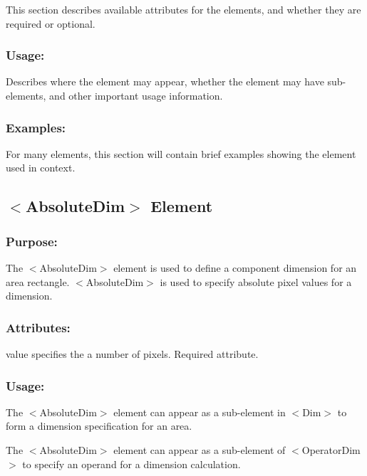 This section describes available attributes for the elements, and whether they are required or optional.\hypertarget{fal_element_ref_fal_elem_ref_sec_1_3}{}\subsubsection{Usage\+:}\label{fal_element_ref_fal_elem_ref_sec_1_3}
Describes where the element may appear, whether the element may have sub-\/elements, and other important usage information.\hypertarget{fal_element_ref_fal_elem_ref_sec_1_4}{}\subsubsection{Examples\+:}\label{fal_element_ref_fal_elem_ref_sec_1_4}
For many elements, this section will contain brief examples showing the element used in context.\hypertarget{fal_element_ref_fal_elem_ref_sec_2}{}\subsection{$<$\+Absolute\+Dim$>$ Element}\label{fal_element_ref_fal_elem_ref_sec_2}
\hypertarget{fal_element_ref_fal_elem_ref_sec_2_1}{}\subsubsection{Purpose\+:}\label{fal_element_ref_fal_elem_ref_sec_2_1}
The {\ttfamily $<$Absolute\+Dim$>$} element is used to define a component dimension for an area rectangle. {\ttfamily $<$Absolute\+Dim$>$} is used to specify absolute pixel values for a dimension.\hypertarget{fal_element_ref_fal_elem_ref_sec_2_2}{}\subsubsection{Attributes\+:}\label{fal_element_ref_fal_elem_ref_sec_2_2}
\begin{DoxyItemize}
\item {\ttfamily value} specifies the a number of pixels. Required attribute.\end{DoxyItemize}
\hypertarget{fal_element_ref_fal_elem_ref_sec_2_3}{}\subsubsection{Usage\+:}\label{fal_element_ref_fal_elem_ref_sec_2_3}
\begin{DoxyItemize}
\item The {\ttfamily $<$Absolute\+Dim$>$} element can appear as a sub-\/element in {\ttfamily $<$Dim$>$} to form a dimension specification for an area. \item The {\ttfamily $<$Absolute\+Dim$>$} element can appear as a sub-\/element of {\ttfamily $<$Operator\+Dim$>$} to specify an operand for a dimension calculation.\end{DoxyItemize}
